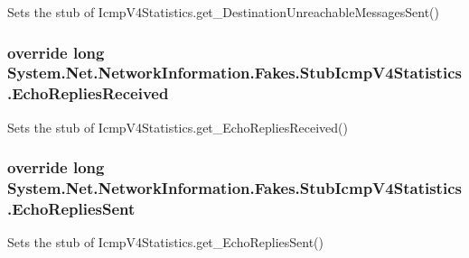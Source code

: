 Sets the stub of Icmp\-V4\-Statistics.\-get\-\_\-\-Destination\-Unreachable\-Messages\-Sent()

\hypertarget{class_system_1_1_net_1_1_network_information_1_1_fakes_1_1_stub_icmp_v4_statistics_a86fe3036218a2e084a32559f2573fcb0}{
\subsubsection[{Echo\-Replies\-Received}]{\setlength{\rightskip}{0pt plus 5cm}override long System.\-Net.\-Network\-Information.\-Fakes.\-Stub\-Icmp\-V4\-Statistics.\-Echo\-Replies\-Received\hspace{0.3cm}{\ttfamily [get]}}}\label{class_system_1_1_net_1_1_network_information_1_1_fakes_1_1_stub_icmp_v4_statistics_a86fe3036218a2e084a32559f2573fcb0}


Sets the stub of Icmp\-V4\-Statistics.\-get\-\_\-\-Echo\-Replies\-Received()

\hypertarget{class_system_1_1_net_1_1_network_information_1_1_fakes_1_1_stub_icmp_v4_statistics_a5992b63600c9b2b306f50c81f2db17cd}{
\subsubsection[{Echo\-Replies\-Sent}]{\setlength{\rightskip}{0pt plus 5cm}override long System.\-Net.\-Network\-Information.\-Fakes.\-Stub\-Icmp\-V4\-Statistics.\-Echo\-Replies\-Sent\hspace{0.3cm}{\ttfamily [get]}}}\label{class_system_1_1_net_1_1_network_information_1_1_fakes_1_1_stub_icmp_v4_statistics_a5992b63600c9b2b306f50c81f2db17cd}


Sets the stub of Icmp\-V4\-Statistics.\-get\-\_\-\-Echo\-Replies\-Sent()

